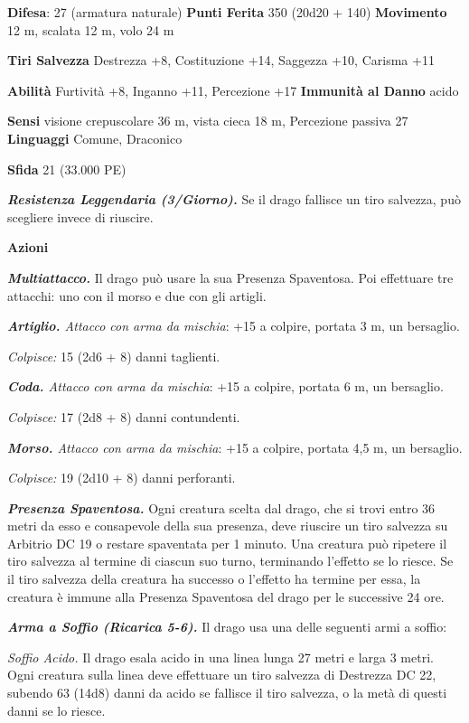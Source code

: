 \begin{multicols}{2}
\textbf{Difesa}: 27 (armatura naturale) \textbf{Punti Ferita}
350 (20d20 + 140) \textbf{Movimento} 12 m, scalata 12 m, volo 24 m

\textbf{Tiri Salvezza} Destrezza +8, Costituzione +14, Saggezza +10,
Carisma +11

\textbf{Abilità} Furtività +8, Inganno +11, Percezione +17
\textbf{Immunità al Danno} acido

\textbf{Sensi} visione crepuscolare 36 m, vista cieca 18 m, Percezione passiva
27 \textbf{Linguaggi} Comune, Draconico

\textbf{Sfida} 21 (33.000 PE)

\emph{\textbf{Resistenza Leggendaria (3/Giorno).}} Se il drago fallisce
un tiro salvezza, può scegliere invece di riuscire.

\textbf{Azioni}

\emph{\textbf{Multiattacco.}} Il drago può usare la sua Presenza
Spaventosa. Poi effettuare tre attacchi: uno con il morso e due con gli
artigli.

\emph{\textbf{Artiglio.} Attacco con arma da mischia}: +15 a colpire,
portata 3 m, un bersaglio.

\emph{Colpisce:} 15 (2d6 + 8) danni taglienti.

\emph{\textbf{Coda.} Attacco con arma da mischia}: +15 a colpire,
portata 6 m, un bersaglio.

\emph{Colpisce:} 17 (2d8 + 8) danni contundenti.

\emph{\textbf{Morso.} Attacco con arma da mischia}: +15 a colpire,
portata 4,5 m, un bersaglio.

\emph{Colpisce:} 19 (2d10 + 8) danni perforanti.

\emph{\textbf{Presenza Spaventosa.}} Ogni creatura scelta dal drago, che
si trovi entro 36 metri da esso e consapevole della sua presenza, deve
riuscire un tiro salvezza su Arbitrio DC 19 o restare spaventata per 1
minuto. Una creatura può ripetere il tiro salvezza al termine di ciascun
suo turno, terminando l'effetto se lo riesce. Se il tiro salvezza della
creatura ha successo o l'effetto ha termine per essa, la creatura è
immune alla Presenza Spaventosa del drago per le successive 24 ore.

\emph{\textbf{Arma a Soffio (Ricarica 5-6).}} Il drago usa una delle
seguenti armi a soffio:

\emph{Soffio Acido.} Il drago esala acido in una linea lunga 27 metri e
larga 3 metri. Ogni creatura sulla linea deve effettuare un tiro
salvezza di Destrezza DC 22, subendo 63 (14d8) danni da acido se
fallisce il tiro salvezza, o la metà di questi danni se lo riesce.


\end{multicols}

